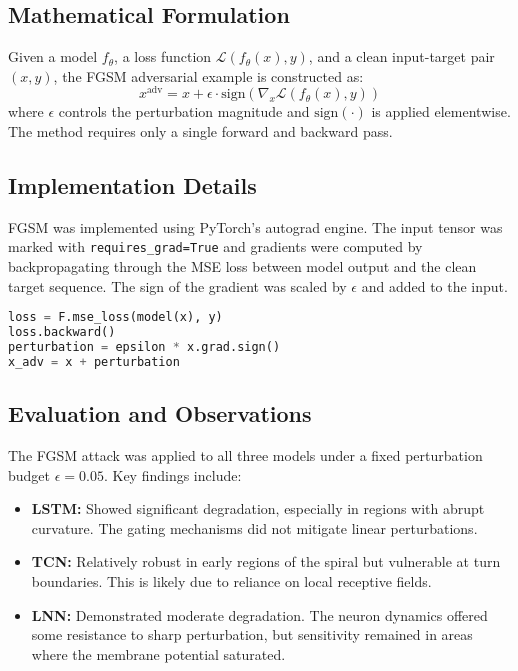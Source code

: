 \subsection{Mathematical Formulation}
Given a model $f_\theta$, a loss function $\mathcal{L}(f_\theta(x), y)$, and a clean input-target pair $(x, y)$, the FGSM adversarial example is constructed as:
\[
x^{\text{adv}} = x + \epsilon \cdot \text{sign} \left( \nabla_x \mathcal{L}(f_\theta(x), y) \right)
\]
where $\epsilon$ controls the perturbation magnitude and $\text{sign}(\cdot)$ is applied elementwise. The method requires only a single forward and backward pass.

\subsection{Implementation Details}
FGSM was implemented using PyTorch's autograd engine. The input tensor was marked with \texttt{requires\_grad=True} and gradients were computed by backpropagating through the MSE loss between model output and the clean target sequence. The sign of the gradient was scaled by $\epsilon$ and added to the input.

\begin{lstlisting}[language=Python, caption={FGSM adversarial attack implementation}]
loss = F.mse_loss(model(x), y)
loss.backward()
perturbation = epsilon * x.grad.sign()
x_adv = x + perturbation
\end{lstlisting}

\subsection{Evaluation and Observations}
The FGSM attack was applied to all three models under a fixed perturbation budget $\epsilon = 0.05$. Key findings include:
\begin{itemize}
    \item \textbf{LSTM:} Showed significant degradation, especially in regions with abrupt curvature. The gating mechanisms did not mitigate linear perturbations.
    \item \textbf{TCN:} Relatively robust in early regions of the spiral but vulnerable at turn boundaries. This is likely due to reliance on local receptive fields.
    \item \textbf{LNN:} Demonstrated moderate degradation. The neuron dynamics offered some resistance to sharp perturbation, but sensitivity remained in areas where the membrane potential saturated.
\end{itemize}


